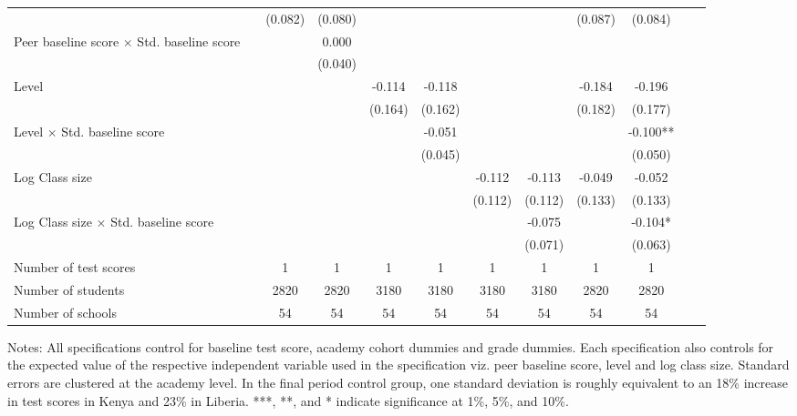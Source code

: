 \begin{center}
\begin{scriptsize}
\begin{threeparttable}
\begin{tabular} {@{} l l c c c c c c c c c c  @{}}
                 &  & (0.082) & (0.080) &  &  &  &  & (0.087) & (0.084) \\
Peer baseline score $\times$ Std. baseline score &  &  & 0.000 &  &  &  &  &  &  \\
                 &  &  & (0.040) &  &  &  &  &  &  \\
Level &  &  &  & -0.114 & -0.118 &  &  & -0.184 & -0.196 \\
                 &  &  &  & (0.164) & (0.162) &  &  & (0.182) & (0.177) \\
Level $\times$ Std. baseline score &  &  &  &  & -0.051 &  &  &  & -0.100** \\
                 &  &  &  &  & (0.045) &  &  &  & (0.050) \\
Log Class size &  &  &  &  &  & -0.112 & -0.113 & -0.049 & -0.052 \\
                 &  &  &  &  &  & (0.112) & (0.112) & (0.133) & (0.133) \\
Log Class size $\times$ Std. baseline score &  &  &  &  &  &  & -0.075 &  & -0.104* \\
                 &  &  &  &  &  &  & (0.071) &  & (0.063) \\
\midrule
Number of test scores &  & 1 & 1 & 1 & 1 & 1 & 1 & 1 & 1 \\
Number of students &  & 2820 & 2820 & 3180 & 3180 & 3180 & 3180 & 2820 & 2820 \\
Number of schools &  & 54 & 54 & 54 & 54 & 54 & 54 & 54 & 54 \\
\bottomrule
\end{tabular}
\begin{tablenotes}
\item Notes: All specifications control for baseline test score, academy cohort dummies and grade dummies. Each specification also controls for the expected value of the respective independent variable used in the specification viz. peer baseline score, level and log class size. Standard errors are clustered at the academy level. In the final period control group, one standard deviation is roughly equivalent to an 18\% increase in test scores in Kenya and 23\% in Liberia. ***, **, and * indicate significance at 1\%, 5\%, and 10\%.\end{tablenotes}
\end{threeparttable}
\end{scriptsize}
\end{center}
\clearpage
